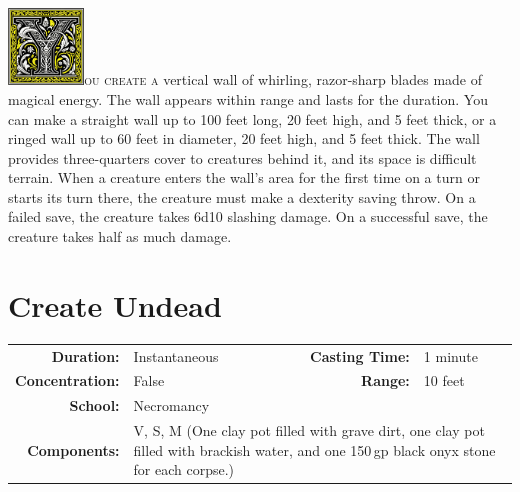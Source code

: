 \documentclass[12pt,showtrims]{memoir}
\begin{document}
\vspace{1\baselineskip}\noindent
\lettrine[lines=4]{\includegraphics[height=58pt]{initials/Y.png}}{ou create a} vertical wall of whirling, razor-sharp blades made of magical energy. The wall appears within range and lasts for the duration. You can make a straight wall up to 100 feet long, 20 feet high, and 5 feet thick, or a ringed wall up to 60 feet in diameter, 20 feet high, and 5 feet thick. The wall provides three-quarters cover to creatures behind it, and its space is difficult terrain. When a creature enters the wall's area for the first time on a turn or starts its turn there, the creature must make a dexterity saving throw. On a failed save, the creature takes 6d10 slashing damage. On a successful save, the creature takes half as much damage.

\newpage
\section*{Create Undead}

{
\small\centering\vspace{-6pt}
\begin{tabular}{rlrl}
\toprule

\textbf{Duration:} & Instantaneous &
\textbf{Casting Time:} & 1 minute \\
\textbf{Concentration:} & False &
\textbf{Range:} & 10 feet \\
\textbf{School:} & Necromancy \\
\textbf{Components:} & \multicolumn{3}{p{0.7\textwidth}}{V, S, M (One clay pot filled with grave dirt, one clay pot filled with brackish water, and one 150\,gp black onyx stone for each corpse.)}\\

\bottomrule
\end{tabular}
}
\end{document}
